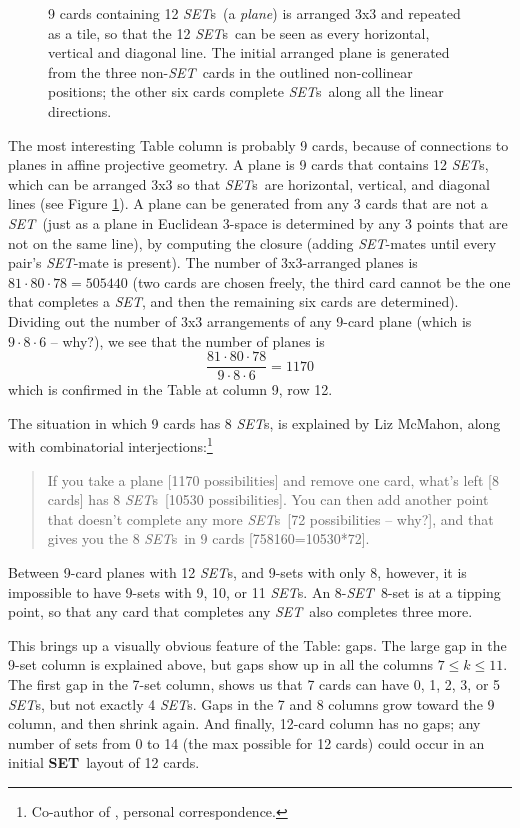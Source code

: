 \documentclass{article}
\newcommand{\SET}{{\em SET}}
\newcommand{\SETs}{{\em SET}s}
\newcommand{\SETg}{{\bf SET}}
\begin{document}
\begin{figure}[!htb]
  \caption{\label{PLANE}9 cards containing 12 \SETs~(a {\em plane}) is arranged
    3x3 and repeated as a tile, so that the 12 \SETs~can be seen as every
    horizontal, vertical and diagonal line. The initial arranged plane is
    generated from the three non-\SET~cards in the outlined non-collinear
    positions; the other six cards complete \SETs~along all the linear
    directions.}
\end{figure}

The most interesting Table column is probably 9 cards, because of connections to
planes in affine projective geometry. A plane is 9 cards that contains 12 \SETs,
which can be arranged 3x3 so that \SETs~are horizontal, vertical, and diagonal
lines (see Figure \ref{PLANE}). A plane can be generated from any 3 cards that
are not a \SET~(just as a plane in Euclidean 3-space is determined by any 3
points that are not on the same line), by computing the closure (adding
\SET-mates until every pair's \SET-mate is present). The number of 3x3-arranged
planes is $81\cdot 80\cdot 78=505440$ (two cards are chosen freely, the third
card cannot be the one that completes a \SET, and then the remaining six cards
are determined). Dividing out the number of 3x3 arrangements of any 9-card plane
(which is $9\cdot 8\cdot 6$ -- why?), we see that the number of planes is
$$\frac{81\cdot 80\cdot 78}{9\cdot 8\cdot 6} = 1170$$
which is confirmed in the Table at column 9, row 12.

The situation in which 9 cards has 8 \SETs, is explained by Liz McMahon, along
with combinatorial interjections:\footnote{Co-author of \cite{JOS}, personal
correspondence.}
\begin{quote}
If you take a plane [1170 possibilities] and remove one card, what's left [8
  cards] has 8 \SETs~[10530 possibilities].  You can then add another point that
doesn't complete any more \SETs~[72 possibilities -- why?], and that gives you
the 8 \SETs~in 9 cards [758160=10530*72].
\end{quote}
Between 9-card planes with 12 \SETs, and 9-sets with only 8, however, it is
impossible to have 9-sets with 9, 10, or 11 \SETs. An 8-\SET~8-set is at a
tipping point, so that any  card that completes any \SET~also completes
three more.

This brings up a visually obvious feature of the Table: gaps. The large gap in
the 9-set column is explained above, but gaps show up in all the columns $7\leq
k \leq 11$. The first gap in the 7-set column, shows us that 7 cards can have 0,
1, 2, 3, or 5 \SETs, but not exactly 4 \SETs. Gaps in the 7 and 8 columns grow
toward the 9 column, and then shrink again. And finally, 12-card column has no
gaps; any number of sets from 0 to 14 (the max possible for 12 cards) could
occur in an initial \SETg~layout of 12 cards.
\end{document}
